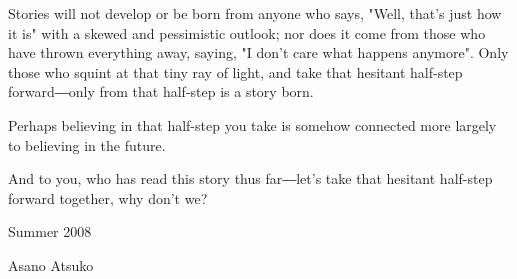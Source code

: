 Stories will not develop or be born from anyone who says, "Well, that's
just how it is" with a skewed and pessimistic outlook; nor does it come
from those who have thrown everything away, saying, "I don't care what
happens anymore". Only those who squint at that tiny ray of light, and
take that hesitant half-step forward―only from that half-step is a story
born.

Perhaps believing in that half-step you take is somehow connected more
largely to believing in the future.

And to you, who has read this story thus far―let's take that hesitant
half-step forward together, why don't we?

Summer 2008

Asano Atsuko
